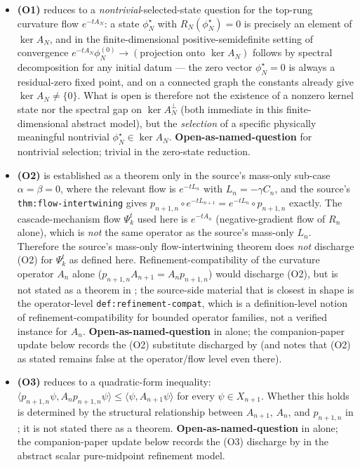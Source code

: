 \documentclass[11pt]{article}
\theoremstyle{definition}
\begin{document}
\begin{itemize}[leftmargin=*, topsep=4pt]
\item \textbf{(O1)} reduces to a \emph{nontrivial}-selected-state
  question for the top-rung curvature flow $e^{-t A_N}$: a state
  $\phi^\star_N$ with $R_N(\phi^\star_N) = 0$ is precisely an
  element of $\ker A_N$, and in the finite-dimensional
  positive-semidefinite setting of \cite{CascadeClosureDynamics}
  convergence
  $e^{-tA_N} \phi_N^{(0)} \to (\text{projection onto } \ker A_N)$
  follows by spectral decomposition for any initial datum --- the
  zero vector $\phi^\star_N = 0$ is always a residual-zero fixed
  point, and on a connected graph the constants already give
  $\ker A_N \neq \{0\}$. What is open is therefore not the
  existence of a nonzero kernel state nor the spectral gap on
  $\ker A_N^\perp$ (both immediate in this finite-dimensional
  abstract model), but the \emph{selection} of a specific
  physically meaningful nontrivial $\phi^\star_N \in \ker A_N$.
  \textbf{Open-as-named-question} for nontrivial selection; trivial
  in the zero-state reduction.
\item \textbf{(O2)} is established as a theorem only in the source's
  mass-only sub-case $\alpha = \beta = 0$, where the relevant flow
  is $e^{-tL_n}$ with $L_n = -\gamma C_n$, and the source's
  \texttt{thm:flow-intertwining} gives
  $p_{n+1, n} \circ e^{-tL_{n+1}} = e^{-tL_n} \circ p_{n+1, n}$
  exactly. The cascade-mechanism flow $\Psi_k^t$ used here is
  $e^{-tA_n}$ (negative-gradient flow of $R_n$ alone), which is
  \emph{not} the same operator as the source's mass-only $L_n$.
  Therefore the source's mass-only flow-intertwining theorem does
  \emph{not} discharge (O2) for $\Psi_k^t$ as defined here.
  Refinement-compatibility of the curvature operator $A_n$ alone
  ($p_{n+1, n} A_{n+1} = A_n p_{n+1, n}$) would discharge (O2), but
  is not stated as a theorem in
  \cite{CascadeClosureDynamics}; the source-side material that is
  closest in shape is the operator-level
  \texttt{def:refinement-compat}, which is a definition-level
  notion of refinement-compatibility for bounded operator families,
  not a verified instance for $A_n$. \textbf{Open-as-named-question}
  in \cite{CascadeClosureDynamics} alone; the companion-paper update
  below records the (O2) substitute discharged by
  \cite{CascadeRefinementCompat} (and notes that (O2) as stated
  remains false at the operator/flow level even there).
\item \textbf{(O3)} reduces to a quadratic-form inequality:
  $\langle p_{n+1, n} \psi, A_n p_{n+1, n} \psi\rangle \leq
  \langle \psi, A_{n+1} \psi\rangle$ for every $\psi \in X_{n+1}$.
  Whether this holds is determined by the structural relationship
  between $A_{n+1}$, $A_n$, and $p_{n+1, n}$ in
  \cite{CascadeClosureDynamics}; it is not stated there as a
  theorem. \textbf{Open-as-named-question} in
  \cite{CascadeClosureDynamics} alone; the companion-paper update
  below records the (O3) discharge by \cite{CascadeRefinementCompat}
  in the abstract scalar pure-midpoint refinement model.
\end{itemize}
\end{document}
